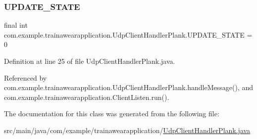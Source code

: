 \subsubsection{\texorpdfstring{UPDATE\_STATE}{UPDATE\_STATE}}
{\footnotesize\ttfamily final int com.\+example.\+trainawearapplication.\+Udp\+Client\+Handler\+Plank.\+U\+P\+D\+A\+T\+E\+\_\+\+S\+T\+A\+TE = 0\hspace{0.3cm}{\ttfamily [static]}}



Definition at line 25 of file Udp\+Client\+Handler\+Plank.\+java.



Referenced by com.\+example.\+trainawearapplication.\+Udp\+Client\+Handler\+Plank.\+handle\+Message(), and com.\+example.\+trainawearapplication.\+Client\+Listen.\+run().



The documentation for this class was generated from the following file\+:\begin{DoxyCompactItemize}
\item 
src/main/java/com/example/trainawearapplication/\mbox{\hyperlink{_udp_client_handler_plank_8java}{Udp\+Client\+Handler\+Plank.\+java}}\end{DoxyCompactItemize}
